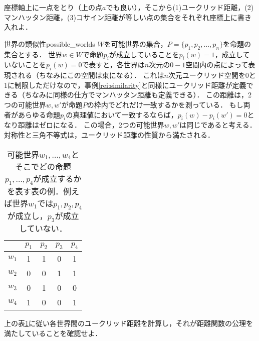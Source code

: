 \documentclass[11pt,a4paper, dvipdfmx]{jsarticle}
\begin{document}
\begin{renshu}{}{}
座標軸上に一点をとり（上の点$a$でも良い），そこから(1)ユークリッド距離，(2)マンハッタン距離，(3)コサイン距離が等しい点の集合をそれぞれ座標上に書き入れよ．
\end{renshu}



\begin{rei}{世界の類似性}{possible_worlds}
$W$を可能世界の集合，$P = \{p_1, p_2, \dots, p_n\}$を命題の集合とする．
世界$w \in W$で命題$p_i$が成立していることを$p_i(w)=1$，成立していないことを$p_i(w)=0$で表すと，各世界は$n$次元の$0-1$空間内の点によって表現される（ちなみにこの空間は束になる）．
これは$n$次元ユークリッド空間を$0$と$1$に制限しただけなので，事例\ref{rei:similarity}と同様にユークリッド距離が定義できる（ちなみに同様の仕方でマンハッタン距離も定義できる）．
この距離は，2つの可能世界$w, w'$が命題$P$の枠内でどれだけ一致するかを測っている．
もし両者があらゆる命題$p_i$の真理値において一致するならば，$p_i(w) - p_i(w')=0$となり距離はゼロになる．
この場合，2つの可能世界$w, w'$は同じであると考える．
対称性と三角不等式は，ユークリッド距離の性質から満たされる．
\end{rei}
\begin{table}[htbp]
 \caption{可能世界$w_1, \dots, w_4$とそこでどの命題$p_1, \dots, p_4$が成立するかを表す表の例．例えば世界$w_1$では$p_1, p_2, p_4$が成立し，$p_3$が成立していない．}
 \centering
 \begin{tabular}[tb]{ccccc}
      & $p_1$ & $p_2$ & $p_3$ & $p_4$ \\ \hline
$w_1$ &  1  &  1  &  0  &  1  \\
$w_2$ &  0  &  0  &  1  &  1  \\
$w_3$ &  0  &  1  &  0  &  0  \\
$w_4$ &  1  &  0  &  0  &  1  
 \end{tabular}
 \label{tb:possible_worlds}
\end{table}

\begin{renshu}{}{}
 上の表\ref{tb:possible_worlds}に従い各世界間のユークリッド距離を計算し，それが距離関数の公理を満たしていることを確認せよ．
\end{renshu}
\end{document}
